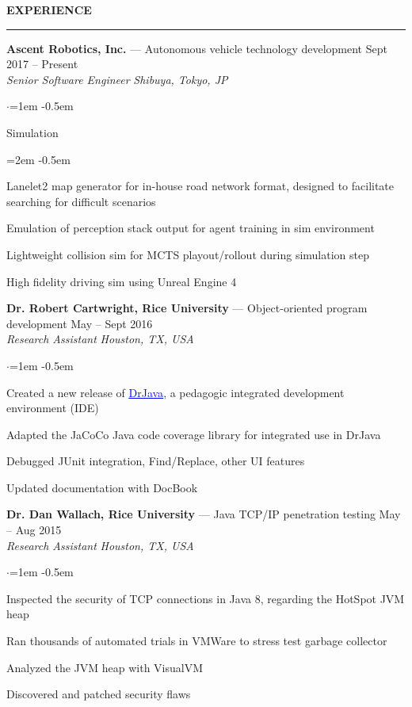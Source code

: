 \documentclass[10pt, a4paper]{article}
\newenvironment{aSection}[1]{
    \medskip \textbf{\uppercase{#1}}
    \smallskip
    \hrule
    \begin{list}{}{
            \setlength{\leftmargin}{1.5em}
        }
    \item[]
    }{
    \end{list}
}
\newenvironment{aSubsection}[4]{
    {#1} \hfill {#2} \\
    \textit{#3} \hfill \textit{#4}
    \smallskip
    \begin{list}{$\cdot$}{\leftmargin=1em}
    \itemsep -0.5em \vspace{-0.5em}
    }{
    \end{list}
    \vspace{0.5em}
}
\begin{document}
\begin{aSection}{Experience}
    \begin{aSubsection}
        {\textbf{Ascent Robotics, Inc.} --- Autonomous vehicle technology development}
        {Sept 2017 -- Present}
        {Senior Software Engineer}
        {Shibuya, Tokyo, JP}
    \item Simulation
        \begin{list}{\raisebox{.4ex}{\tiny$\rightharpoonup$}}{\leftmargin=2em}
            \itemsep -0.5em \vspace{-0.5em}
            \item Lanelet2 map generator for in-house road network format, designed to facilitate
                searching for difficult scenarios
            \item Emulation of perception stack output for agent training in sim environment
            \item Lightweight collision sim for MCTS playout/rollout during simulation step
            \item High fidelity driving sim using Unreal Engine 4
        \end{list}
    \end{aSubsection}

    \begin{aSubsection}
        {\textbf{Dr. Robert Cartwright, Rice University} --- Object-oriented program development}
        {May -- Sept 2016}
        {Research Assistant}
        {Houston, TX, USA}
    \item Created a new release of
        \href{http://www.drjava.org}{\textcolor{blue}{\underline{DrJava}}}, a pedagogic integrated
        development environment (IDE)
    \item Adapted the JaCoCo Java code coverage library for integrated use in DrJava
    \item Debugged JUnit integration, Find/Replace, other UI features
    \item Updated documentation with DocBook
    \end{aSubsection}

    \begin{aSubsection}
        {\textbf{Dr. Dan Wallach, Rice University} --- Java TCP/IP penetration testing}
        {May -- Aug 2015}
        {Research Assistant}
        {Houston, TX, USA}
    \item Inspected the security of TCP connections in Java 8, regarding the HotSpot JVM heap
    \item Ran thousands of automated trials in VMWare to stress test garbage collector
    \item Analyzed the JVM heap with VisualVM
    \item Discovered and patched security flaws
    \end{aSubsection}


\end{aSection}
\end{document}
